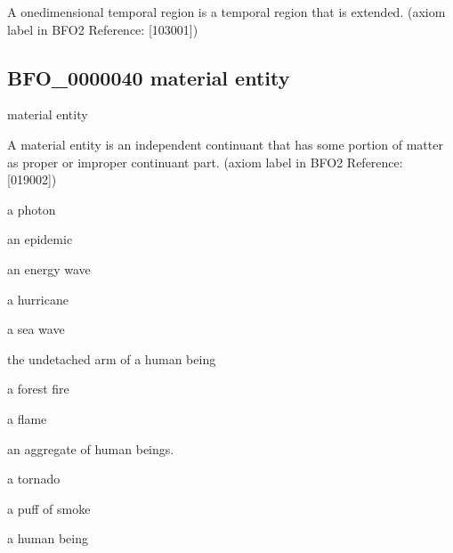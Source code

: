 \documentclass[letterpaper,10pt,english]{sphinxmanual}
\begin{document}
\begin{sphinxShadowBox}

\sphinxAtStartPar
A one\sphinxhyphen{}dimensional temporal region is a temporal region that is extended. (axiom label in BFO2 Reference: {[}103\sphinxhyphen{}001{]})
\end{sphinxShadowBox}

\begin{sphinxShadowBox}

\sphinxAtStartPar
{}
\end{sphinxShadowBox}
\begin{quote}

\ignorespaces \end{quote}


\subsection{BFO\_0000040 \sphinxhyphen{} material entity}
\label{\detokenize{doc-BFO_0000040:bfo-0000040-material-entity}}\label{\detokenize{doc-BFO_0000040:index-0}}\label{\detokenize{doc-BFO_0000040::doc}}
\begin{sphinxShadowBox}

\sphinxAtStartPar
material entity
\end{sphinxShadowBox}

\begin{sphinxShadowBox}

\sphinxAtStartPar
A material entity is an independent continuant that has some portion of matter as proper or improper continuant part. (axiom label in BFO2 Reference: {[}019\sphinxhyphen{}002{]})
\end{sphinxShadowBox}

\begin{sphinxShadowBox}

\sphinxAtStartPar
a photon

\sphinxAtStartPar
an epidemic

\sphinxAtStartPar
an energy wave

\sphinxAtStartPar
a hurricane

\sphinxAtStartPar
a sea wave

\sphinxAtStartPar
the undetached arm of a human being

\sphinxAtStartPar
a forest fire

\sphinxAtStartPar
a flame

\sphinxAtStartPar
an aggregate of human beings.

\sphinxAtStartPar
a tornado

\sphinxAtStartPar
a puff of smoke

\sphinxAtStartPar
a human being
\end{sphinxShadowBox}
\end{document}
